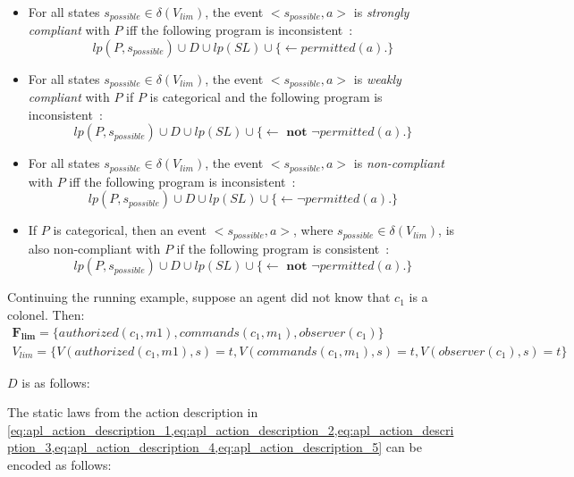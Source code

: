 \begin{definition}
    \label{def:authorization_event_compliance_partial_knowledge}
    ~

    \begin{itemize}
        \item For all states $s_{possible} \in \delta(V_{lim})$, the event $<s_{possible}, a>$ is \textit{strongly compliant} with $P$ iff the following program is inconsistent~\citep{gelfond_authorization_2008}:
            \[
                lp(P, s_{possible}) \cup D \cup lp(SL) \cup \{ \leftarrow permitted(a). \}
            \]
        \item For all states $s_{possible} \in \delta(V_{lim})$, the event $<s_{possible}, a>$ is \textit{weakly compliant} with $P$ if $P$ is categorical and the following program is inconsistent~\citep{gelfond_authorization_2008}:
            \[
                lp(P, s_{possible}) \cup D \cup lp(SL) \cup \{ \leftarrow \textbf{ not } \neg permitted(a). \}
            \]
        \item For all states $s_{possible} \in \delta(V_{lim})$, the event $<s_{possible}, a>$ is \textit{non-compliant} with $P$ iff the following program is inconsistent~\citep{gelfond_authorization_2008}:
            \[
                lp(P, s_{possible}) \cup D \cup lp(SL) \cup \{ \leftarrow \neg permitted(a). \}
            \]
        \item If $P$ is categorical, then an event $<s_{possible}, a>$, where $s_{possible} \in \delta(V_{lim})$, is also non-compliant with $P$ if the following program is consistent~\citep{gelfond_authorization_2008}:
            \[
                lp(P,s_{possible}) \cup D \cup lp(SL) \cup \{ \leftarrow \textbf{ not } \neg permitted(a). \}
            \]
    \end{itemize}
\end{definition}

Continuing the running example, suppose an agent did not know that $c_1$ is a colonel. Then:
\begin{gather*}
    \boldsymbol{F_{lim}} = \{ authorized(c_1, m1), commands(c_1, m_1), observer(c_1) \} \\
    V_{lim} = \{ V(authorized(c_1, m1), s) = t, V(commands(c_1, m_1), s) = t, V(observer(c_1), s) = t \}
\end{gather*}

$D$ is as follows:


The static laws from the action description in \cref{eq:apl_action_description_1,eq:apl_action_description_2,eq:apl_action_description_3,eq:apl_action_description_4,eq:apl_action_description_5} can be encoded as follows:


